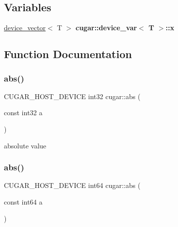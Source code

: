 \subsection*{Variables}
\begin{DoxyCompactItemize}
\item 
\mbox{\label{group___basic_gad554735037ac2baf007987f3bd884133}} 
\hyperlink{structcugar_1_1device__vector}{device\+\_\+vector}$<$ T $>$ {\bfseries cugar\+::device\+\_\+var$<$ T $>$\+::x}
\end{DoxyCompactItemize}


\subsection{Function Documentation}
\mbox{\label{group___basic_gafc4cc49011584e022dbf9c13fa7b95ee}} 
\subsubsection{\texorpdfstring{abs()}{abs()}\hspace{0.1cm}{\footnotesize\ttfamily [1/4]}}
{\footnotesize\ttfamily C\+U\+G\+A\+R\+\_\+\+H\+O\+S\+T\+\_\+\+D\+E\+V\+I\+CE int32 cugar\+::abs (\begin{DoxyParamCaption}\item[{const int32}]{a }\end{DoxyParamCaption})\hspace{0.3cm}{\ttfamily [inline]}}

absolute value \mbox{\label{group___basic_gad4c63fa8a391708719f2a5dff73fa25a}} 
\subsubsection{\texorpdfstring{abs()}{abs()}\hspace{0.1cm}{\footnotesize\ttfamily [2/4]}}
{\footnotesize\ttfamily C\+U\+G\+A\+R\+\_\+\+H\+O\+S\+T\+\_\+\+D\+E\+V\+I\+CE int64 cugar\+::abs (\begin{DoxyParamCaption}\item[{const int64}]{a }\end{DoxyParamCaption})\hspace{0.3cm}{\ttfamily [inline]}}

